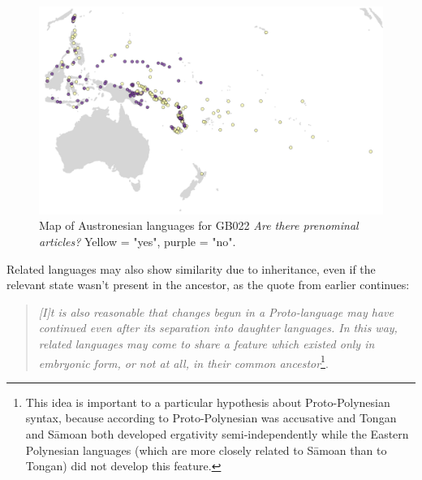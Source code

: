 \documentclass[draft,10pt]{article} %
\begin{document}
\begin{figure}
\centering
\includegraphics[width=12cm]{illustrations/plots_from_R/map_GB022.png}
\caption{{Map of Austronesian languages for GB022 \emph{Are there prenominal articles?} Yellow = "yes", purple = "no".}}
\label{fig:gb022_map}
\end{figure}


Related languages may also show similarity due to inheritance, even if the relevant state wasn't present in the ancestor, as the quote from \citet{chung1977aspects} earlier continues:

\begin{quotation}
\noindent\emph{[I]t is also reasonable that changes begun in a Proto-language may have continued even after its separation into daughter languages. In this way, related languages may come to share a feature which existed only in embryonic form, or not at all, in their common ancestor}\footnote{This idea is important to a particular hypothesis about Proto-Polynesian syntax, because according to \citet{chung1978} Proto-Polynesian was accusative and Tongan and S\={a}moan both developed ergativity semi-independently while the Eastern Polynesian languages (which are more closely related to S\={a}moan than to Tongan) did not develop this feature.}.
\end{quotation}
\begin{flushright} \citet[539]{chung1977aspects} \end{flushright}
\end{document}
